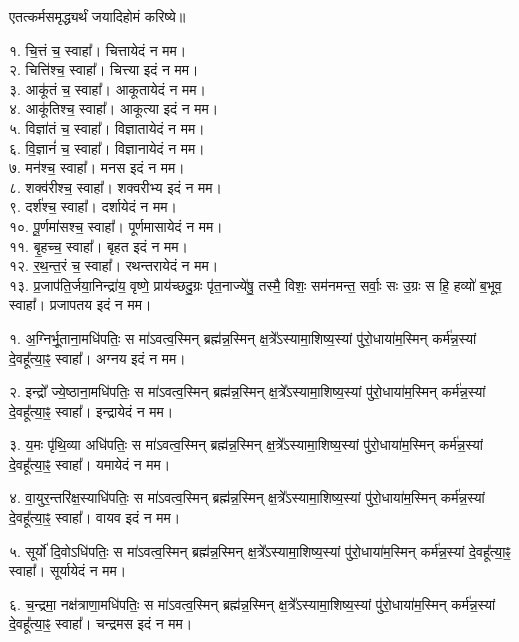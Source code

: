 
एतत्कर्मसमृद्ध्यर्थं जयादिहोमं करिष्ये॥

१. चि॒त्तं च॒ स्वाहा᳚। चित्तायेदं न मम।\\
२. चित्ति॑श्च॒ स्वाहा᳚। चित्त्या इदं न मम।\\
३. आकू॑तं च॒ स्वाहा᳚। आकूतायेदं न मम।\\
४. आकू॑तिश्च॒ स्वाहा᳚। आकूत्या इदं न मम।\\
५. विज्ञा॑तं च॒ स्वाहा᳚। विज्ञातायेदं न मम।\\
६. वि॒ज्ञानं॑ च॒ स्वाहा᳚। विज्ञानायेदं न मम।\\
७. मन॑श्च॒ स्वाहा᳚। मनस इदं न मम।\\
८. शक्व॑रीश्च॒ स्वाहा᳚। शक्वरीभ्य इदं न मम।\\
९. दर्श॑श्च॒ स्वाहा᳚। दर्शायेदं न मम।\\
१०. पू॒र्णमा॑सश्च॒ स्वाहा᳚। पूर्णमासायेदं न मम।\\
११. बृ॒हच्च॒ स्वाहा᳚। बृहत इदं न मम।\\
१२. र॒थ॒न्त॒रं च॒ स्वाहा᳚। रथन्तरायेदं न मम।\\
१३. प्र॒जाप॑ति॒र्जया॒निन्द्रा॑य॒ वृष्णे॒ प्राय॑च्छदु॒ग्रः पृ॑त॒नाज्ये॑षु॒ तस्मै॒ विशः॒ सम॑नमन्त॒ सर्वाः॒ सः उ॒ग्रः स हि॒ हव्यो॑ ब॒भूव॒ स्वाहा᳚। प्रजापतय इदं न मम।\\

\clearpage

१. अ॒ग्निर्भू॒ताना॒मधि॑पतिः॒ स मा॑ऽवत्व॒स्मिन् ब्रह्म॑न्न॒स्मिन् क्ष॒त्रे᳚ऽस्यामा॒शिष्य॒स्यां पु॑रो॒धाया॑म॒स्मिन् कर्म॑न्न॒स्यां दे॒वहू᳚त्या॒ꣴ॒ स्वाहा᳚। अग्नय इदं न मम।

२. इन्द्रो᳚ ज्ये॒ष्ठाना॒मधि॑पतिः॒ स मा॑ऽवत्व॒स्मिन् ब्रह्म॑न्न॒स्मिन् क्ष॒त्रे᳚ऽस्यामा॒शिष्य॒स्यां पु॑रो॒धाया॑म॒स्मिन् कर्म॑न्न॒स्यां दे॒वहू᳚त्या॒ꣴ॒ स्वाहा᳚। इन्द्रायेदं न मम।

३. य॒मः पृ॑थि॒व्या अधि॑पतिः॒ स मा॑ऽवत्व॒स्मिन् ब्रह्म॑न्न॒स्मिन् क्ष॒त्रे᳚ऽस्यामा॒शिष्य॒स्यां पु॑रो॒धाया॑म॒स्मिन् कर्म॑न्न॒स्यां दे॒वहू᳚त्या॒ꣴ॒ स्वाहा᳚। यमायेदं न मम।

४. वा॒युर॒न्तरि॑क्ष॒स्याधि॑पतिः॒ स मा॑ऽवत्व॒स्मिन् ब्रह्म॑न्न॒स्मिन् क्ष॒त्रे᳚ऽस्यामा॒शिष्य॒स्यां पु॑रो॒धाया॑म॒स्मिन् कर्म॑न्न॒स्यां दे॒वहू᳚त्या॒ꣴ॒ स्वाहा᳚। वायव इदं न मम।

५. सूर्यो॑ दि॒वोऽधि॑पतिः॒ स मा॑ऽवत्व॒स्मिन् ब्रह्म॑न्न॒स्मिन् क्ष॒त्रे᳚ऽस्यामा॒शिष्य॒स्यां पु॑रो॒धाया॑म॒स्मिन् कर्म॑न्न॒स्यां दे॒वहू᳚त्या॒ꣴ॒ स्वाहा᳚। सूर्यायेदं न मम।

६. च॒न्द्रमा॒ नक्ष॑त्राणा॒मधि॑पतिः॒ स मा॑ऽवत्व॒स्मिन् ब्रह्म॑न्न॒स्मिन् क्ष॒त्रे᳚ऽस्यामा॒शिष्य॒स्यां पु॑रो॒धाया॑म॒स्मिन् कर्म॑न्न॒स्यां दे॒वहू᳚त्या॒ꣴ॒ स्वाहा᳚। चन्द्रमस इदं न मम।

